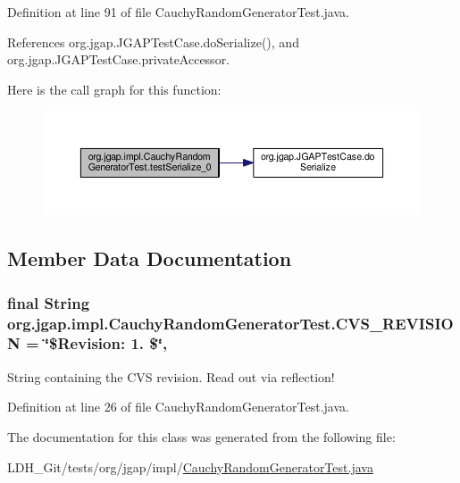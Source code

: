 Definition at line 91 of file Cauchy\-Random\-Generator\-Test.\-java.



References org.\-jgap.\-J\-G\-A\-P\-Test\-Case.\-do\-Serialize(), and org.\-jgap.\-J\-G\-A\-P\-Test\-Case.\-private\-Accessor.



Here is the call graph for this function\-:
\nopagebreak
\begin{figure}[H]
\begin{center}
\leavevmode
\includegraphics[width=350pt]{classorg_1_1jgap_1_1impl_1_1_cauchy_random_generator_test_a157a2f8e2d9d45bfd8dc63fc63cc4867_cgraph}
\end{center}
\end{figure}




\subsection{Member Data Documentation}
\hypertarget{classorg_1_1jgap_1_1impl_1_1_cauchy_random_generator_test_a22237fc504630f8b03232d9775e60169}{
\subsubsection[{C\-V\-S\-\_\-\-R\-E\-V\-I\-S\-I\-O\-N}]{\setlength{\rightskip}{0pt plus 5cm}final String org.\-jgap.\-impl.\-Cauchy\-Random\-Generator\-Test.\-C\-V\-S\-\_\-\-R\-E\-V\-I\-S\-I\-O\-N = \char`\"{}\$Revision\-: 1. \$\char`\"{}\hspace{0.3cm}{\ttfamily [static]}, {\ttfamily [private]}}}\label{classorg_1_1jgap_1_1impl_1_1_cauchy_random_generator_test_a22237fc504630f8b03232d9775e60169}
String containing the C\-V\-S revision. Read out via reflection! 

Definition at line 26 of file Cauchy\-Random\-Generator\-Test.\-java.



The documentation for this class was generated from the following file\-:\begin{DoxyCompactItemize}
\item 
L\-D\-H\-\_\-\-Git/tests/org/jgap/impl/\hyperlink{_cauchy_random_generator_test_8java}{Cauchy\-Random\-Generator\-Test.\-java}\end{DoxyCompactItemize}
